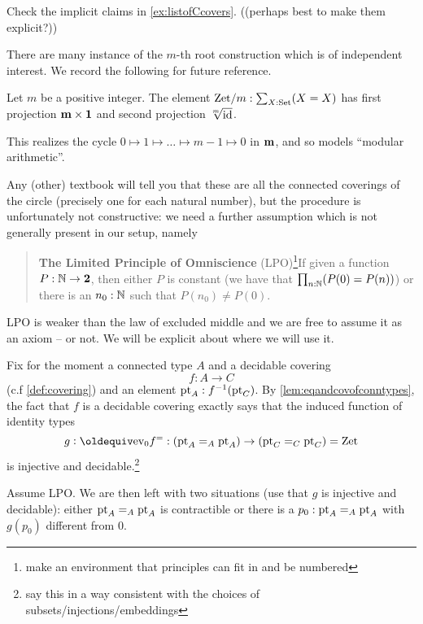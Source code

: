 \begin{xca}
  Check the implicit claims in \cref{ex:listofCcovers}.  ((perhaps best to make them explicit?))
\end{xca}
There are many instance of the $m$-th root construction which is of independent interest.  We record the following for future reference.
\begin{definition}
  \label{def:Zetmodm}
  Let $m$ be a positive integer.
  The element $\mathrm{Zet}/m:\sum_{X:\mathord{\mathrm{Set}}}(X=X)$ has first projection $\mathbf{m}\times\mathbf{1}$ and second projection $\sqrt[m]{\mathord{\mathrm{id}}}$.
\end{definition}
This realizes the cycle $0\mapsto1\mapsto\dots\mapsto m-1\mapsto 0$ in $\mathbf{m}$, and so models ``modular arithmetic''.


Any (other) textbook will tell you that these are all the connected coverings of the circle (precisely one for each natural number), but the procedure is unfortunately not constructive: we need a further assumption which is not generally present in our setup, namely

\begin{quote}
  {\bf The Limited Principle of Omniscience} (LPO)\label{LPO}\footnote{make an environment that principles can fit in and be numbered}If given a function $P:\mathbb{N}\to\mathbf{2}$, then either $P$ is constant (we have that $\prod_{n:\mathbb{N}}(P(0)=P(n))$) or there is an $n_0:\mathbb{N}$ such that $P(n_0)\neq P(0)$.
\end{quote}
LPO is weaker than the law of excluded middle and we are free to assume it as an axiom -- or not.  We will be explicit about where we will use it.


Fix for the moment a connected type $A$ and a decidable covering 
$$f:A\to C$$ (c.f \cref{def:covering}) and an element ${\mathord{\mathrm{pt}}}_A:f^{-1}({\mathord{\mathrm{pt}}}_C)$.  %
By \cref{lem:eqandcovofconntypes}, the fact that $f$ is a decidable covering exactly says that the induced function of identity types
$$g\defequi\ev_0f^=:(\pt_A=_A\pt_A)\to (\pt_C=_C\pt_C)=\zet$$ is injective and decidable.\footnote{say this in a way consistent with the choices of subsets/injections/embeddings}    

Assume LPO.  We are then left with two situations (use that $g$ is injective and decidable): either ${\mathord{\mathrm{pt}}}_A=_A{\mathord{\mathrm{pt}}}_A$ is contractible or there is a $p_0:{\mathord{\mathrm{pt}}}_A=_A{\mathord{\mathrm{pt}}}_A$ with $g(p_0)$ different from $0$. 

